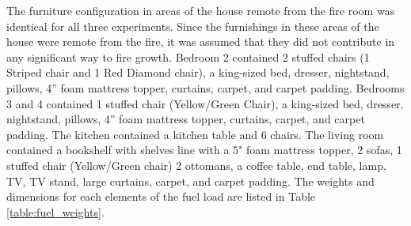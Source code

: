 \documentclass{article}
\begin{document}
The furniture configuration in areas of the house remote from the fire room was identical for all three experiments. Since the furnishings in these areas of the house were remote from the fire, it was assumed that they did not contribute in any significant way to fire growth.  Bedroom 2 contained 2 stuffed chairs (1 Striped chair and 1 Red Diamond chair), a king-sized bed, dresser, nightstand, pillows, 4'' foam mattress topper, curtains, carpet, and carpet padding. Bedrooms 3 and 4 contained 1 stuffed chair (Yellow/Green Chair), a king-sized bed, dresser, nightstand, pillows, 4'' foam mattress topper, curtains, carpet, and carpet padding. The kitchen contained a kitchen table and 6 chairs. The living room contained a bookshelf with shelves line with a 5" foam mattress topper, 2 sofas, 1 stuffed chair (Yellow/Green chair) 2 ottomans, a coffee table, end table, lamp, TV, TV stand, large curtains, carpet, and carpet padding. The weights and dimensions for each elements of the fuel load are listed in Table \ref{table:fuel_weights}.
\end{document}
